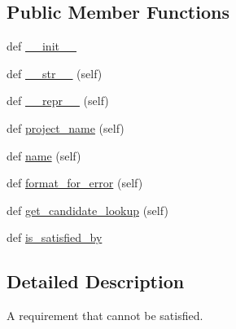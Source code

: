 \subsection*{Public Member Functions}
\begin{DoxyCompactItemize}
\item 
def \hyperlink{classpip_1_1__internal_1_1resolution_1_1resolvelib_1_1requirements_1_1UnsatisfiableRequirement_a3a5b03a8b093ca3d6a49192702f3b964}{\+\_\+\+\_\+init\+\_\+\+\_\+}
\item 
def \hyperlink{classpip_1_1__internal_1_1resolution_1_1resolvelib_1_1requirements_1_1UnsatisfiableRequirement_a6553e62c81c0da585895d48acd1e9bb2}{\+\_\+\+\_\+str\+\_\+\+\_\+} (self)
\item 
def \hyperlink{classpip_1_1__internal_1_1resolution_1_1resolvelib_1_1requirements_1_1UnsatisfiableRequirement_abbca9cb387bcea5cb4da61c814f5183f}{\+\_\+\+\_\+repr\+\_\+\+\_\+} (self)
\item 
def \hyperlink{classpip_1_1__internal_1_1resolution_1_1resolvelib_1_1requirements_1_1UnsatisfiableRequirement_a9985e734d8ed70efb4876b171d028d04}{project\+\_\+name} (self)
\item 
def \hyperlink{classpip_1_1__internal_1_1resolution_1_1resolvelib_1_1requirements_1_1UnsatisfiableRequirement_a77f31caeee540862d1b31aa4ba6b0b2b}{name} (self)
\item 
def \hyperlink{classpip_1_1__internal_1_1resolution_1_1resolvelib_1_1requirements_1_1UnsatisfiableRequirement_a330175de93126c80e300ffbe09f782dc}{format\+\_\+for\+\_\+error} (self)
\item 
def \hyperlink{classpip_1_1__internal_1_1resolution_1_1resolvelib_1_1requirements_1_1UnsatisfiableRequirement_a910a1c5b5b85e3a31c6e88364e76cf62}{get\+\_\+candidate\+\_\+lookup} (self)
\item 
def \hyperlink{classpip_1_1__internal_1_1resolution_1_1resolvelib_1_1requirements_1_1UnsatisfiableRequirement_a15bdc9c1ee9d58eb53ebd87eea81698d}{is\+\_\+satisfied\+\_\+by}
\end{DoxyCompactItemize}


\subsection{Detailed Description}
\begin{DoxyVerb}A requirement that cannot be satisfied.\end{DoxyVerb}
 

